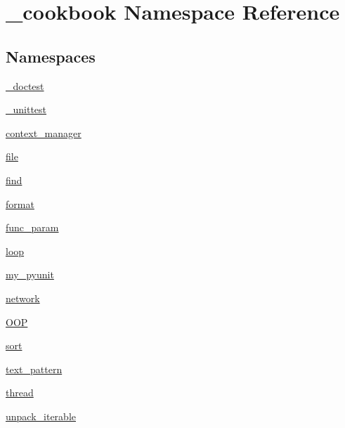 \hypertarget{namespace__cookbook}{\section{\-\_\-cookbook Namespace Reference}
\label{namespace__cookbook}
}
\subsection*{Namespaces}
\begin{DoxyCompactItemize}
\item 
\hyperlink{namespace__cookbook_1_1__doctest}{\-\_\-doctest}
\item 
\hyperlink{namespace__cookbook_1_1__unittest}{\-\_\-unittest}
\item 
\hyperlink{namespace__cookbook_1_1context__manager}{context\-\_\-manager}
\item 
\hyperlink{namespace__cookbook_1_1file}{file}
\item 
\hyperlink{namespace__cookbook_1_1find}{find}
\item 
\hyperlink{namespace__cookbook_1_1format}{format}
\item 
\hyperlink{namespace__cookbook_1_1func__param}{func\-\_\-param}
\item 
\hyperlink{namespace__cookbook_1_1loop}{loop}
\item 
\hyperlink{namespace__cookbook_1_1my__pyunit}{my\-\_\-pyunit}
\item 
\hyperlink{namespace__cookbook_1_1network}{network}
\item 
\hyperlink{namespace__cookbook_1_1OOP}{O\-O\-P}
\item 
\hyperlink{namespace__cookbook_1_1sort}{sort}
\item 
\hyperlink{namespace__cookbook_1_1text__pattern}{text\-\_\-pattern}
\item 
\hyperlink{namespace__cookbook_1_1thread}{thread}
\item 
\hyperlink{namespace__cookbook_1_1unpack__iterable}{unpack\-\_\-iterable}
\end{DoxyCompactItemize}
